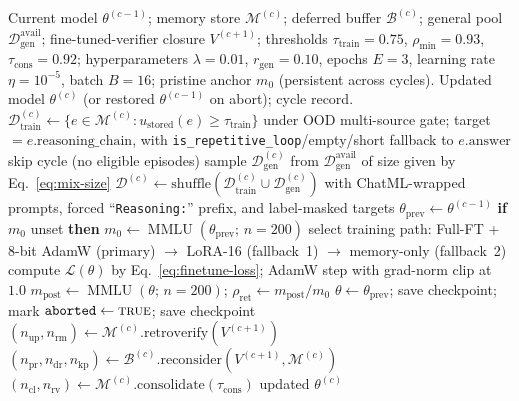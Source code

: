 \begin{algorithm}
\caption{Stage~8 self-improvement cycle (one invocation per cycle boundary).}
\label{alg:self-improvement}
\begin{algorithmic}[1]
\Require Current model $\theta^{(c-1)}$; memory store $\mathcal{M}^{(c)}$; deferred buffer $\mathcal{B}^{(c)}$; general pool $\mathcal{D}_{\text{gen}}^{\text{avail}}$; fine-tuned-verifier closure $V^{(c+1)}$; thresholds $\tau_{\text{train}} = 0.75$, $\rho_{\min} = 0.93$, $\tau_{\text{cons}} = 0.92$; hyperparameters $\lambda = 0.01$, $r_{\text{gen}} = 0.10$, epochs $E = 3$, learning rate $\eta = 10^{-5}$, batch $B = 16$; pristine anchor $m_{0}$ (persistent across cycles).
\Ensure Updated model $\theta^{(c)}$ (or restored $\theta^{(c-1)}$ on abort); cycle record.
\State $\mathcal{D}_{\text{train}}^{(c)} \gets \{e \in \mathcal{M}^{(c)} : u_{\text{stored}}(e) \geq \tau_{\text{train}}\}$ under OOD multi-source gate; target $= e.\text{reasoning\_chain}$, with \texttt{is\_repetitive\_loop}/empty/short fallback to $e.\text{answer}$
    \State \Return skip cycle (no eligible episodes)
\EndIf
\State sample $\mathcal{D}_{\text{gen}}^{(c)}$ from $\mathcal{D}_{\text{gen}}^{\text{avail}}$ of size given by Eq.~\ref{eq:mix-size}
\State $\mathcal{D}^{(c)} \gets \text{shuffle}(\mathcal{D}_{\text{train}}^{(c)} \cup \mathcal{D}_{\text{gen}}^{(c)})$ with ChatML-wrapped prompts, forced ``\texttt{Reasoning:}'' prefix, and label-masked targets
\State $\theta_{\text{prev}} \gets \theta^{(c-1)}$ 
\State \textbf{if} $m_{0}$ unset \textbf{then} $m_{0} \gets \operatorname{MMLU}(\theta_{\text{prev}};\, n{=}200)$ 
\State select training path: Full-FT + 8-bit AdamW (primary) $\to$ LoRA-16 (fallback~1) $\to$ memory-only (fallback~2)
        \State compute $\mathcal{L}(\theta)$ by Eq.~\ref{eq:finetune-loss}; AdamW step with grad-norm clip at $1.0$
    \EndFor
\EndFor
\State $m_{\text{post}} \gets \operatorname{MMLU}(\theta;\, n{=}200)$; $\rho_{\text{ret}} \gets m_{\text{post}} / m_{0}$ 
    \State $\theta \gets \theta_{\text{prev}}$; save checkpoint; mark $\texttt{aborted} \gets \textsc{true}$; \Return {}
\EndIf
\State save checkpoint
\State $(n_{\text{up}}, n_{\text{rm}}) \gets \mathcal{M}^{(c)}.\text{retroverify}(V^{(c+1)})$ 
\State $(n_{\text{pr}}, n_{\text{dr}}, n_{\text{kp}}) \gets \mathcal{B}^{(c)}.\text{reconsider}(V^{(c+1)}, \mathcal{M}^{(c)})$ 
    \State $(n_{\text{cl}}, n_{\text{rv}}) \gets \mathcal{M}^{(c)}.\text{consolidate}(\tau_{\text{cons}})$ 
\EndIf
\State \Return updated $\theta^{(c)}$
\end{algorithmic}
\end{algorithm}

